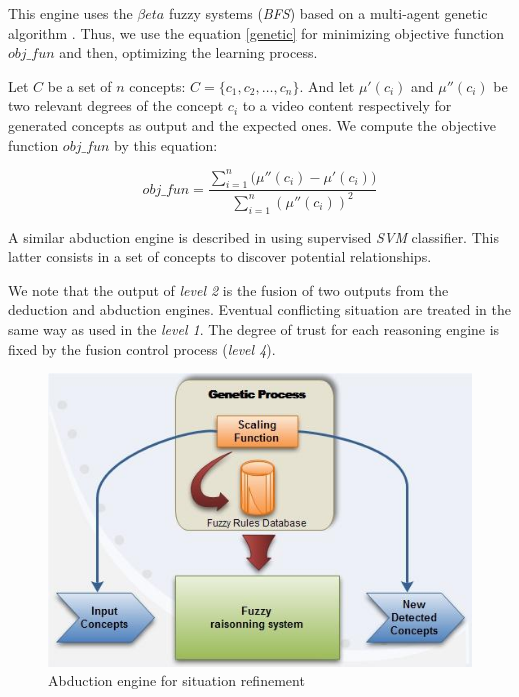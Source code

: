 		This engine uses the $\beta{}eta$ fuzzy systems (\emph{BFS}) based on a multi-agent genetic algorithm \citep{Kallel2006}.
		Thus, we use the equation \ref{genetic} for minimizing objective function $obj\_fun$ and then, 
		optimizing the learning process.
		
		Let $C$ be a set of $n$ concepts: $C = \{c_{1}, c_{2}, \dots, c_{n}\}$.
		And let $\mu'(c_{i})$ and $\mu''(c_{i})$ be two relevant degrees of the concept $c_{i}$ to a video content 
		respectively for generated concepts as output and the expected ones.
		We compute the objective function $obj\_fun$ by this equation:

		\begin{equation}
			\label{genetic}
			obj\_fun = \frac{\sum_{i=1}^{n} \Big(\mu''(c_{i}) - \mu'(c_{i})\Big)}{\sum_{i=1}^{n}(\mu''(c_{i}))^2}
		\end{equation}
		
		
		A similar abduction engine is described in \citep{Snoek2006} using  supervised \emph{SVM} classifier. 
		This latter consists in  a set of concepts to discover potential relationships.

		We note that the output of \emph{level 2} is the fusion of two outputs from the deduction and abduction engines. 
		Eventual conflicting situation are treated in the same way as used in the \emph{level 1}. The degree of trust 
		for each reasoning engine is fixed by the fusion control process (\emph{level 4}).
		\begin{figure}[h]
			\centering
			\includegraphics[scale=0.45]{graphics/contrib1::abduction}
			\caption{Abduction engine for situation refinement}
			\label{abduction}
		\end{figure}
		
